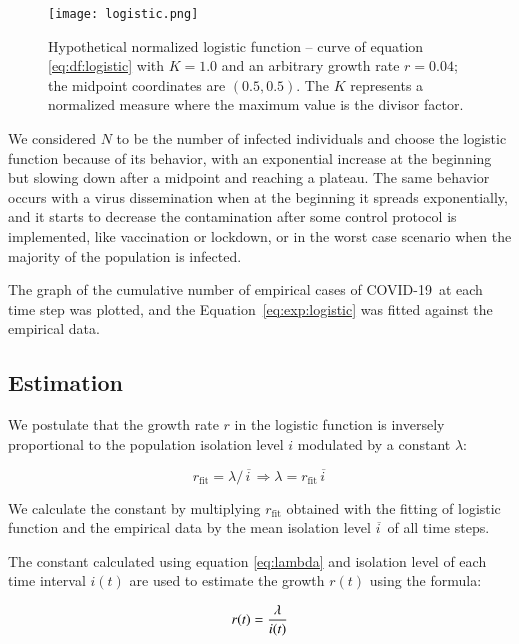\documentclass[review]{elsarticle}
\def\covid{\hbox{COVID-19}} %
\begin{document}
\begin{figure}
\centering
\texttt{[image: logistic.png]}
\caption{Hypothetical normalized logistic function -- 
curve of equation \ref{eq:df:logistic} with 
$K=1.0$ and an arbitrary growth rate $r=0.04$; 
the midpoint coordinates are $(0.5, 0.5)$.
The $K$ represents a normalized measure where 
the maximum value is the divisor factor.}
\label{fig:logistic}
\end{figure}

We considered $N$ to be the number of infected individuals 
and choose the logistic function because of its behavior, 
with an exponential increase at the beginning but slowing down after 
a  midpoint and reaching a plateau. 
The same behavior occurs with a virus dissemination when at the 
beginning it spreads exponentially, and it starts to 
decrease the contamination after some control protocol is implemented, 
like vaccination or lockdown, 
or in the worst case scenario when the majority of the population is infected.

The graph of the cumulative number of empirical cases of \covid\ 
at each time step was plotted, 
and the Equation~\ref{eq:exp:logistic} was fitted against the 
empirical data.

\subsection{Estimation}

We postulate that the growth rate $r$ in the logistic function is 
inversely proportional to the population isolation level $i$ 
modulated by a constant $\lambda$:

\begin{equation}
r_{\text{fit}} = {\lambda /\, \overline{i\,}} \Rightarrow \lambda = r_{\text{fit}}\, \overline{i\,}
\label{eq:lambda}
\end{equation}

We calculate the constant by multiplying $r_{\text{fit}}$ 
obtained with the fitting of 
logistic function and the empirical data by 
the mean isolation level $\overline{i\,}$  
of all time steps.

The constant calculated using equation \ref{eq:lambda} 
and isolation level of each time interval $i(t)$ 
are used to estimate the growth $r(t)$ using the formula:

\begin{equation}
r(t) = {\lambda\over i(t)}
\label{eq:rt}
\end{equation}
\end{document}

